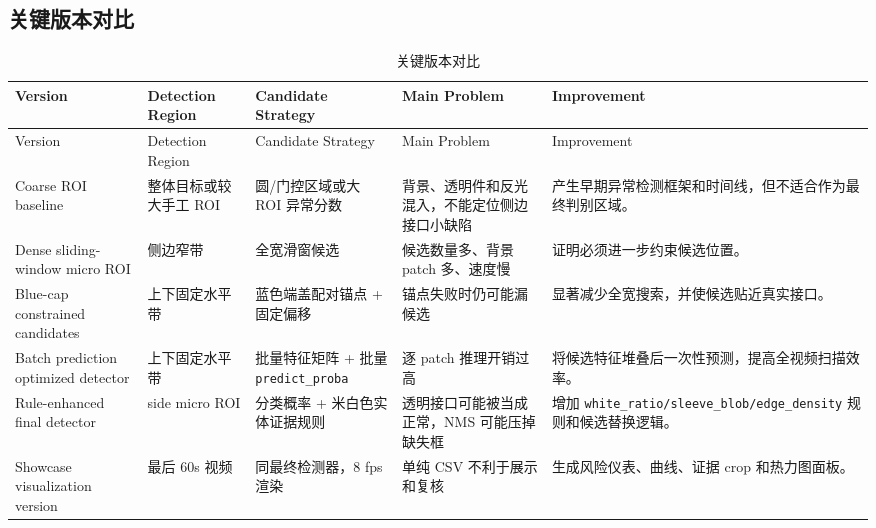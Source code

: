 \documentclass[a4paper,12pt]{article}
\newcommand{\code}[1]{\texttt{#1}}
\begin{document}
\subsection{关键版本对比}
\begin{longtable}{L{0.18\textwidth}L{0.19\textwidth}L{0.20\textwidth}L{0.20\textwidth}L{0.15\textwidth}}
\caption{关键版本对比}
\label{tab:version-comparison}\\
\toprule
Version & Detection Region & Candidate Strategy & Main Problem & Improvement \\
\midrule
\endfirsthead
\toprule
Version & Detection Region & Candidate Strategy & Main Problem & Improvement \\
\midrule
\endhead
Coarse ROI baseline & 整体目标或较大手工 ROI & 圆/门控区域或大 ROI 异常分数 & 背景、透明件和反光混入，不能定位侧边接口小缺陷 & 产生早期异常检测框架和时间线，但不适合作为最终判别区域。 \\
Dense sliding-window micro ROI & 侧边窄带 & 全宽滑窗候选 & 候选数量多、背景 patch 多、速度慢 & 证明必须进一步约束候选位置。 \\
Blue-cap constrained candidates & 上下固定水平带 & 蓝色端盖配对锚点 + 固定偏移 & 锚点失败时仍可能漏候选 & 显著减少全宽搜索，并使候选贴近真实接口。 \\
Batch prediction optimized detector & 上下固定水平带 & 批量特征矩阵 + 批量 \code{predict\_proba} & 逐 patch 推理开销过高 & 将候选特征堆叠后一次性预测，提高全视频扫描效率。 \\
Rule-enhanced final detector & side micro ROI & 分类概率 + 米白色实体证据规则 & 透明接口可能被当成正常，NMS 可能压掉缺失框 & 增加 \code{white\_ratio/sleeve\_blob/edge\_density} 规则和候选替换逻辑。 \\
Showcase visualization version & 最后 $60$s 视频 & 同最终检测器，$8$ fps 渲染 & 单纯 CSV 不利于展示和复核 & 生成风险仪表、曲线、证据 crop 和热力图面板。 \\
\bottomrule
\end{longtable}
\end{document}
